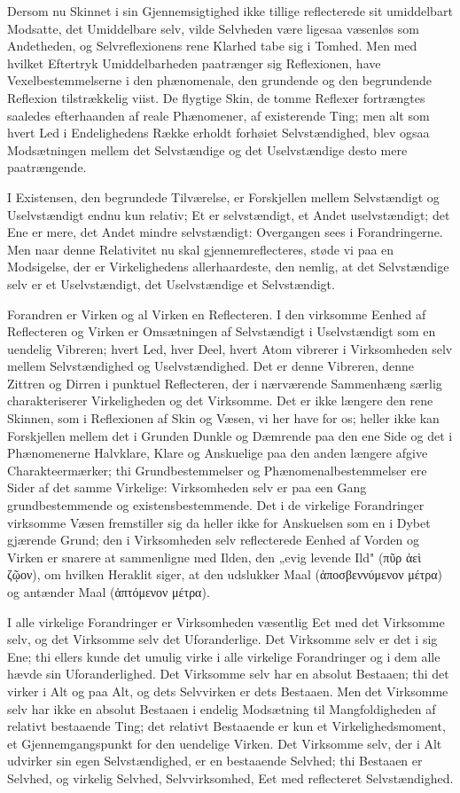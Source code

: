\documentclass[12pt]{book}
\newcommand{\opage}[1]{\marginnote{\footnotesize\textit{[#1]}}}
\begin{document}
Dersom nu Skinnet i sin Gjennemsigtighed ikke tillige reflecterede sit umiddelbart
Modsatte, det Umiddelbare selv, vilde Selvheden være ligesaa væsenløs som Andetheden,
og Selvreflexionens rene Klarhed tabe sig i Tomhed. Men med hvilket Eftertryk
Umiddelbarheden paatrænger sig Reflexionen, have Vexelbestemmelserne i den
phænomenale, den grundende og den begrundende Reflexion tilstrækkelig viist. De
flygtige Skin, de tomme Reflexer fortrængtes saaledes efterhaanden af reale
Phænomener, af existerende Ting; men alt som hvert Led i Endelighedens Række erholdt
forhøiet Selvstændighed, blev ogsaa Modsætningen mellem det Selvstændige og det
Uselvstændige desto mere paatrængende.

I Existensen, den begrundede Tilværelse, er Forskjellen mellem Selvstændigt og
Uselvstændigt endnu kun relativ; Et er selvstændigt, et Andet uselvstændigt; det Ene
er mere, det Andet mindre selvstændigt: Overgangen sees i Forandringerne. Men naar
denne Relativitet nu skal gjennemreflecteres, støde vi paa en Modsigelse, der er
Virkelighedens allerhaardeste,
\opage{109} den nemlig, at det Selvstændige selv er et Uselvstændigt, det Uselvstændige et
Selvstændigt.

Forandren er Virken og al Virken en Reflecteren. I den virksomme Eenhed af Reflecteren
og Virken er Omsætningen af Selvstændigt i Uselvstændigt som en uendelig Vibreren;
hvert Led, hver Deel, hvert Atom vibrerer i Virksomheden selv mellem Selvstændighed og
Uselvstændighed. Det er denne Vibreren, denne Zittren og Dirren i punktuel
Reflecteren, der i nærværende Sammenhæng særlig charakteriserer Virkeligheden og det
Virksomme. Det er ikke længere den rene Skinnen, som i Reflexionen af Skin og Væsen,
vi her have for os; heller ikke kan Forskjellen mellem det i Grunden Dunkle og
Dæmrende paa den ene Side og det i Phænomenerne Halvklare, Klare og Anskuelige paa den
anden længere afgive Charakteermærker; thi Grundbestemmelser og Phænomenalbestemmelser
ere Sider af det samme Virkelige: Virksomheden selv er paa een Gang grundbestemmende
og existensbestemmende. Det i de virkelige Forandringer virksomme Væsen fremstiller
sig da heller ikke for Anskuelsen som en i Dybet gjærende Grund; den i Virksomheden
selv reflecterede Eenhed af Vorden og Virken er snarere at sammenligne med Ilden, den
„evig levende Ild" (πῦρ ἀεὶ ζῷον), om hvilken Heraklit siger, at den udslukker Maal
(ἀποσβεννύμενον μέτρα) og antænder Maal (ἁπτόμενον μέτρα).

I alle virkelige Forandringer er Virksomheden væsentlig Eet med det Virksomme selv, og
det Virksomme selv det Uforanderlige. Det Virksomme selv er det i sig Ene; thi ellers
kunde det umulig virke i alle virkelige Forandringer og i dem alle hævde sin
Uforanderlighed. Det Virksomme selv har en absolut Bestaaen; thi det virker i Alt og
paa Alt, og dets Selvvirken er dets Bestaaen. Men det Virksomme selv har ikke en
absolut Bestaaen i endelig Modsætning til Mangfoldigheden af relativt bestaaende Ting;
det relativt Bestaaende er kun et Virkelighedsmoment, et Gjennemgangspunkt for den
\opage{110} uendelige Virken. Det Virksomme selv, der i Alt udvirker sin egen Selvstændighed, er
en bestaaende Selvhed; thi Bestaaen er Selvhed, og virkelig Selvhed, Selvvirksomhed,
Eet med reflecteret Selvstændighed.
\end{document}
